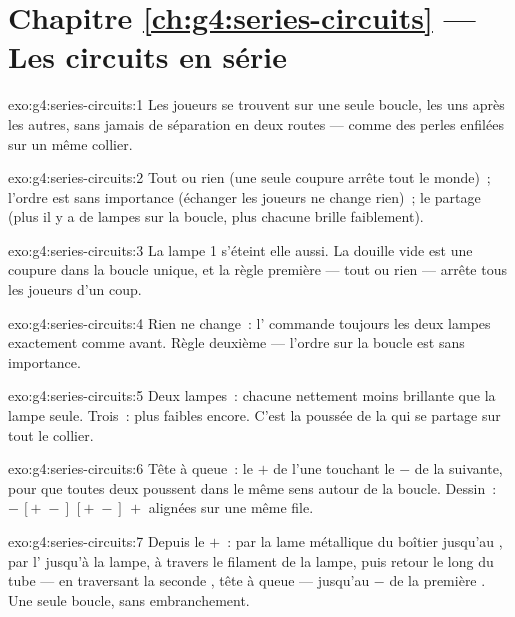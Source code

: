 \section*{Chapitre \ref{ch:g4:series-circuits} --- Les circuits en série}

\begin{solution}{exo:g4:series-circuits:1}
Les joueurs se trouvent sur une seule boucle, les uns après les
autres, sans jamais de séparation en deux routes --- comme des perles
enfilées sur un même collier.
\end{solution}

\begin{solution}{exo:g4:series-circuits:2}
Tout ou rien (une seule coupure arrête tout le monde)~; l'ordre est
sans importance (échanger les joueurs ne change rien)~; le partage
(plus il y a de lampes sur la boucle, plus chacune brille
faiblement).
\end{solution}

\begin{solution}{exo:g4:series-circuits:3}
La lampe 1 s'éteint elle aussi. La douille vide est une coupure dans
la boucle unique, et la règle première --- tout ou rien --- arrête
tous les joueurs d'un coup.
\end{solution}

\begin{solution}{exo:g4:series-circuits:4}
Rien ne change~: l' commande toujours les deux lampes
exactement comme avant. Règle deuxième --- l'ordre sur la boucle est
sans importance.
\end{solution}

\begin{solution}{exo:g4:series-circuits:5}
Deux lampes~: chacune nettement moins brillante que la lampe seule.
Trois~: plus faibles encore. C'est la poussée de la  qui se
partage sur tout le collier.
\end{solution}

\begin{solution}{exo:g4:series-circuits:6}
Tête à queue~: le $+$ de l'une touchant le $-$ de la suivante, pour
que toutes deux poussent dans le même sens autour de la boucle.
Dessin~: $-\,[{+}\;{-}]\,[{+}\;{-}]\,+$ alignées sur une même file.
\end{solution}

\begin{solution}{exo:g4:series-circuits:7}
Depuis le $+$~: par la lame métallique du boîtier jusqu'au
, par l' jusqu'à la lampe, à travers
le filament de la lampe, puis retour le long du tube --- en
traversant la seconde , tête à queue --- jusqu'au $-$ de la
première . Une seule boucle, sans embranchement.
\end{solution}

